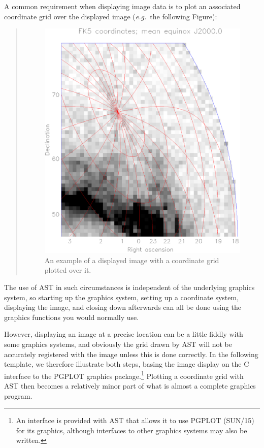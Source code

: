 \documentclass[twoside,11pt]{article}
\newcommand{\xref}[3]{#1}
\begin{document}
\begin{htmlonly}
   A common requirement when displaying image data is to plot an
   associated coordinate grid over the displayed image ({\em{e.g.}}\
   the following Figure):
   \begin{quote}
   \begin{figure}[bhtp]
   \label{fig:overgrid}
   \includegraphics[scale=0.8]{sun211_figures/overgrid.eps}
   \caption{An example of a displayed image with a coordinate grid
   plotted over it.}
   \end{figure}
   \end{quote}
\end{htmlonly}
The use of AST in such circumstances is independent of the underlying
graphics system, so starting up the graphics system, setting up a
coordinate system, displaying the image, and closing down afterwards
can all be done using the graphics functions you would normally use.

However, displaying an image at a precise location can be a little
fiddly with some graphics systems, and obviously the grid drawn by AST
will not be accurately registered with the image unless this is done
correctly. In the following template, we therefore illustrate both
steps, basing the image display on the C interface to the PGPLOT
graphics package.\footnote{An interface is provided with AST that
allows it to use PGPLOT (\xref{SUN/15}{sun15}{}) for its graphics,
although interfaces to other graphics systems may also be written.}
Plotting a coordinate grid with AST then becomes a relatively minor
part of what is almost a complete graphics program.
\end{document}
